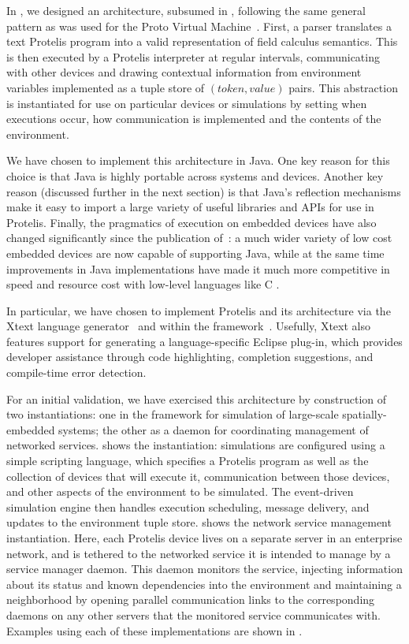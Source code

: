 \documentclass[12pt,a4paper,twoside,openright]{book}
\begin{document}
In \protelis{}, we designed an architecture, subsumed in , following the same general pattern as was used for the Proto Virtual Machine~\cite{protokernel}.
%
First, a parser translates a text Protelis program into a valid representation of field calculus semantics.
%
This is then executed by a Protelis interpreter at regular intervals, communicating with other devices and drawing contextual information from environment variables implemented as a tuple store of $(token, value)$ pairs.
%
This abstraction is instantiated for use on particular devices or simulations by setting when executions occur, how communication is implemented and the contents of the environment.

We have chosen to implement this architecture in Java.
%
One key reason for this choice is that Java is highly portable across systems and devices.
%
Another key reason (discussed further in the next section) is that Java's reflection mechanisms make it easy to import a large variety of useful libraries and APIs for use in Protelis.
%
Finally, the pragmatics of execution on embedded devices have also changed significantly since the publication of~\cite{protokernel}: a much wider variety of low cost embedded devices are now capable of supporting Java, while at the same time improvements in Java implementations have made it much more competitive in speed and resource cost with low-level languages like C \cite{bull2003, oancea2011}.

In particular, we have chosen to implement Protelis and its architecture via the Xtext language generator~\cite{eysholdt2010xtext} and within the \alchemist{} framework~\cite{alchemist-jos2013}.
%
Usefully, Xtext also features support for generating a language-specific Eclipse plug-in, which provides developer assistance through code highlighting, completion suggestions, and compile-time error detection.

For an initial validation, we have exercised this architecture by construction of two instantiations: one in the \alchemist{} framework for simulation of large-scale spatially-embedded systems; the other as a daemon for coordinating management of networked services.
%
 shows the \alchemist{} instantiation: simulations are configured using a simple scripting language, which specifies a Protelis program as well as the collection of devices that will execute it, communication between those devices, and other aspects of the environment to be simulated.
%
The \alchemist{} event-driven simulation engine then handles execution scheduling, message delivery, and updates to the environment tuple store.
%
 shows the network service management instantiation.
%
Here, each Protelis device lives on a separate server in an enterprise network, and is tethered to the networked service it is intended to manage by a service manager daemon.
%
This daemon monitors the service, injecting information about its status and known dependencies into the environment and maintaining a neighborhood by opening parallel communication links to the corresponding daemons on any other servers that the monitored service communicates with.
%
Examples using each of these implementations are shown in .
\end{document}
